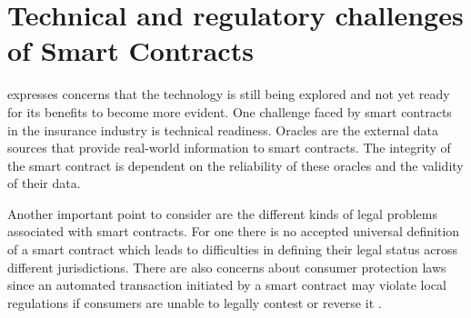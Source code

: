 \section{Technical and regulatory challenges of Smart Contracts}\label{section:regulatory_technical_challenges}

\autocite{gatteschi2018blockchain} expresses concerns that the technology is still being explored and not yet ready for its benefits to become more evident. One challenge faced by smart contracts in the insurance industry is technical readiness. Oracles are the external data sources that provide real-world information to smart contracts. The integrity of the smart contract is dependent on the reliability of these oracles and the validity of their data. 

Another important point to consider are the different kinds of legal problems associated with smart contracts. For one there is no accepted universal definition of a smart contract which leads to difficulties in defining their legal status across different jurisdictions. There are also concerns about consumer protection laws since an automated transaction initiated by a smart contract may violate local regulations if consumers are unable to legally contest or reverse it \autocite{ferreira2021regulating}.